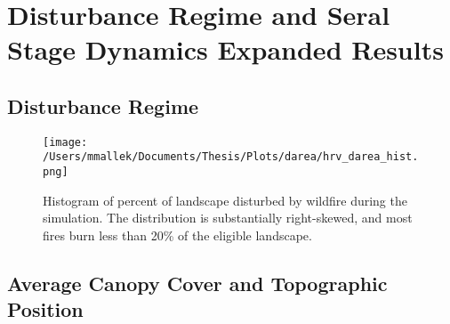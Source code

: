 \chapter{Disturbance Regime and Seral Stage Dynamics Expanded Results}
\label{app:full-results}

\section{Disturbance Regime}
\begin{figure}[!htbp]
\centering
\texttt{[image: /Users/mmallek/Documents/Thesis/Plots/darea/hrv\_darea\_hist.png]}
\caption{Histogram of percent of landscape disturbed by wildfire during the simulation. The distribution is substantially right-skewed, and most fires burn less than 20\% of the eligible landscape.}
\label{fig:darea_hist}
\end{figure}


\section{Average Canopy Cover and Topographic Position}

